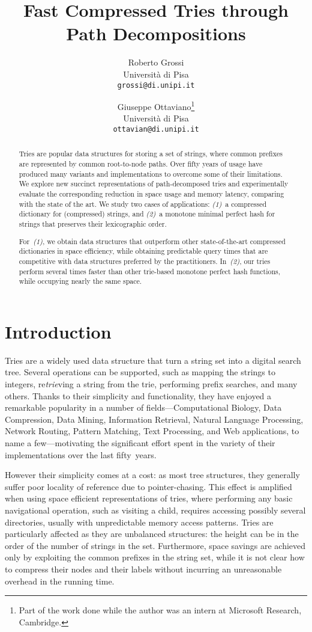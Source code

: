 \documentclass[a4paper,11pt]{article}
\title{Fast Compressed Tries through Path Decompositions}
\author{
  Roberto Grossi \\ \small Università di Pisa \\ \small \texttt{grossi@di.unipi.it}
  \and
  Giuseppe Ottaviano\footnote{Part of the work done while the author was an intern at Microsoft Research, Cambridge.} \\ \small Università di Pisa \\ \small \texttt{ottavian@di.unipi.it}
}
\date{}
\theoremstyle{nonumberplain}
\begin{document}
\maketitle

\begin{abstract}
  Tries are popular data structures for storing a set of strings,
  where common prefixes are represented by common root-to-node
  paths. Over fifty years of usage have produced many variants and
  implementations to overcome some of their limitations. We explore
  new succinct representations of path-decomposed tries and
  experimentally evaluate the corresponding reduction in space usage
  and memory latency, comparing with the state of the art. We study
  two cases of applications: \emph{(1)}~a compressed dictionary for
  (compressed) strings, and \emph{(2)}~a monotone minimal perfect hash
  for strings that preserves their lexicographic order.

  For~\emph{(1)}, we obtain data structures that outperform other
  state-of-the-art compressed dictionaries in space efficiency, while
  obtaining predictable query times that are competitive with data
  structures preferred by the practitioners. In~\emph{(2)}, our tries
  perform several times faster than other trie-based monotone perfect
  hash functions, while occupying nearly the same space.
\end{abstract}

\setcounter{page}{0}
\thispagestyle{empty}

\newpage

\section{Introduction}
\label{sec:introduction}



Tries are a widely used data structure that turn a string set into a
digital search tree. Several operations can be supported, such as mapping the
strings to integers, re\emph{trie}ving a string from the trie, performing
prefix searches, and many others.
Thanks to their simplicity and functionality, they have enjoyed a
remarkable popularity in a number of fields---Computational Biology, Data
Compression, Data Mining, Information Retrieval, Natural Language
Processing, Network Routing, Pattern Matching, Text Processing, and
Web applications, to name a few---motivating the significant effort
spent in the variety of their implementations over the last fifty~years.

However their simplicity comes at a cost: as most tree structures,
they generally suffer poor locality of reference due to
pointer-chasing. This effect is amplified when using space efficient
representations of tries, where performing any basic navigational
operation, such as visiting a child, requires accessing possibly
several directories, usually with unpredictable memory access
patterns. Tries are particularly affected as they are unbalanced
structures: the height can be in the order of the number of strings in
the set. Furthermore, space savings are achieved only by
exploiting the common prefixes in the string set, while it is not clear
how to compress their nodes and their labels without incurring an
unreasonable overhead in the running time.
\end{document}
